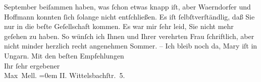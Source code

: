 \begin{ledgroupsized}[t]{13cm}
               September beiſammen haben, was ſchon etwas knapp iſt, aber Waerndorfer und Hoffmann konnten ſich ſolange nicht entſchließen. Es iſt ſelbſtverſtändlig,
               daß Sie nur in die beſte Geſellschaft kommen.\pend
           \pstart
           Es war mir ſehr leid, Sie nicht mehr geſehen zu haben. So wünſch ich Ihnen und Ihrer
               verehrten Frau ſchriftlich,
               aber nicht minder herzlich recht angenehmen Sommer. – Ich bleib noch da, Mary iſt in Ungarn.\pend
           \pstart
           Mit den beſten Empfehlungen{\\[\baselineskip]}Ihr ſehr ergebener{\\[\baselineskip]}\spacefill\mbox{Max Mell.}\pend
           \leftskip=0em{}\pstart
           II. Wittelsbachſtr. 5.\pend
           
         
         \endnumbering{}\end{ledgroupsized}  \newcommand{\dateiname}{L01692}\newcommand{\titel}{Max Mell an Arthur Schnitzler, 15. 7. 1907}\newcommand{\editorInnen}{Martin Anton Müller und Gerd-Hermann Susen}
      